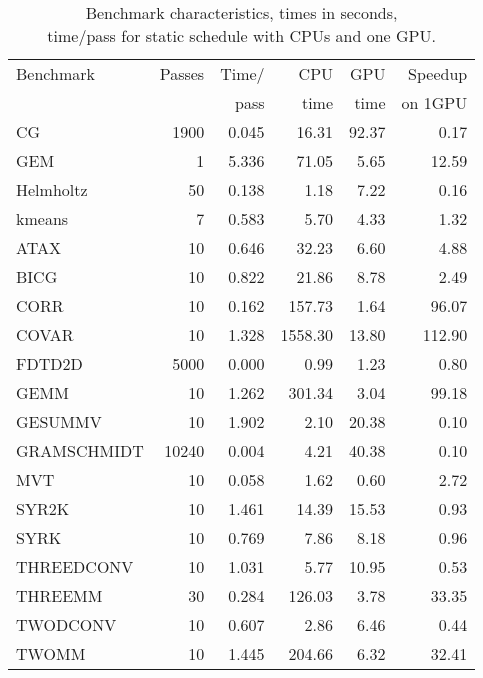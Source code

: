 \begin{table}[t]
    \centering
\footnotesize{
    \begin{tabular}{|l|r|r|r|r|r|}
        \hline
        Benchmark   & Passes & Time/ & CPU     & GPU   & Speedup \\
                    &        & pass  & time    & time  & on 1GPU \\
        \hline
        CG          & 1900   & 0.045 & 16.31   & 92.37 & 0.17    \\
        GEM         & 1      & 5.336 & 71.05   & 5.65  & 12.59   \\
        Helmholtz   & 50     & 0.138 & 1.18    & 7.22  & 0.16    \\
        kmeans      & 7      & 0.583 & 5.70    & 4.33  & 1.32    \\
        \hline
        ATAX        & 10     & 0.646 & 32.23   & 6.60  & 4.88    \\
        BICG        & 10     & 0.822 & 21.86   & 8.78  & 2.49    \\
        CORR        & 10     & 0.162 & 157.73  & 1.64  & 96.07   \\
        COVAR       & 10     & 1.328 & 1558.30 & 13.80 & 112.90  \\
        FDTD2D      & 5000   & 0.000 & 0.99    & 1.23  & 0.80    \\
        GEMM        & 10     & 1.262 & 301.34  & 3.04  & 99.18   \\
        GESUMMV     & 10     & 1.902 & 2.10    & 20.38 & 0.10    \\
        GRAMSCHMIDT & 10240  & 0.004 & 4.21    & 40.38 & 0.10    \\
        MVT         & 10     & 0.058 & 1.62    & 0.60  & 2.72    \\
        SYR2K       & 10     & 1.461 & 14.39   & 15.53 & 0.93    \\
        SYRK        & 10     & 0.769 & 7.86    & 8.18  & 0.96    \\
        THREEDCONV  & 10     & 1.031 & 5.77    & 10.95 & 0.53    \\
        THREEMM     & 30     & 0.284 & 126.03  & 3.78  & 33.35   \\
        TWODCONV    & 10     & 0.607 & 2.86    & 6.46  & 0.44    \\
        TWOMM       & 10     & 1.445 & 204.66  & 6.32  & 32.41   \\
        \hline
    \end{tabular}
}
    \caption{Benchmark characteristics, times in seconds, \\
             time/pass for static schedule with CPUs and one GPU.}
    \label{tab:bench}
\end{table}

